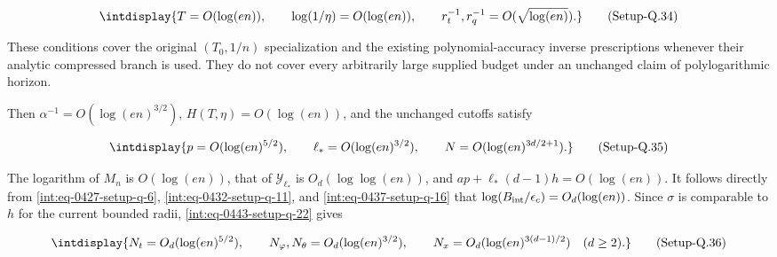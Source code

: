 \label{int:eq-setup-q-34}
\begingroup\renewcommand{\theHequation}{intdisplay.907}
\begin{equation}
\intdisplay{
T=O(\log(en)),\qquad \log(1/\eta)=O(\log(en)),\qquad
r_t^{-1},r_q^{-1}=O(\sqrt{\log(en)}).
}
\tag{Setup-Q.34}
\label{int:eq-0453-setup-q-34}
\end{equation}
\endgroup


These conditions cover the original \((T_0,\allowbreak 1/n)\) specialization and the existing polynomial-accuracy inverse prescriptions whenever their analytic compressed branch is used. They do not cover every arbitrarily large supplied budget under an unchanged claim of polylogarithmic horizon.



Then \(\alpha^{-1}=O(\log(en)^{3/2})\), \(H(T,\allowbreak \eta)=O(\log(en))\), and the unchanged cutoffs satisfy


\label{int:eq-setup-q-35}
\begingroup\renewcommand{\theHequation}{intdisplay.908}
\begin{equation}
\intdisplay{
p=O(\log(en)^{5/2}),\qquad
\ell_*=O(\log(en)^{3/2}),\qquad
N=O(\log(en)^{3d/2+1}).
}
\tag{Setup-Q.35}
\label{int:eq-0454-setup-q-35}
\end{equation}
\endgroup


The logarithm of \(M_n\) is \(O(\log(en))\), that of \(\mathcal Y_{\ell_*}\) is \(O_d(\log\log(en))\), and \(ap+\ell_*(d-1)h=O(\log(en))\). It follows directly from \hyperref[int:eq-setup-q-6]{\eqref{int:eq-0427-setup-q-6}}, \hyperref[int:eq-setup-q-11]{\eqref{int:eq-0432-setup-q-11}}, and \hyperref[int:eq-setup-q-16]{\eqref{int:eq-0437-setup-q-16}} that \(\log(B_{\rm int}/\epsilon_c)=O_d(\log(en))\). Since \(\sigma\) is comparable to \(h\) for the current bounded radii, \hyperref[int:eq-setup-q-22]{\eqref{int:eq-0443-setup-q-22}} gives


\label{int:eq-setup-q-36}
\begingroup\renewcommand{\theHequation}{intdisplay.909}
\begin{equation}
\intdisplay{
N_t=O_d(\log(en)^{5/2}),\qquad
N_\varphi,N_\theta=O_d(\log(en)^{3/2}),\qquad
N_x=O_d(\log(en)^{3(d-1)/2})\quad(d\ge2).
}
\tag{Setup-Q.36}
\label{int:eq-0455-setup-q-36}
\end{equation}
\endgroup

